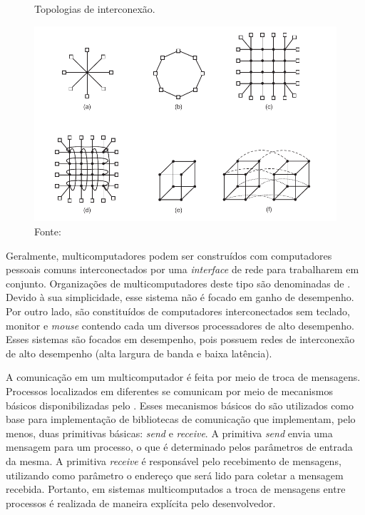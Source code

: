 \begin{figure}[t]
	\centering
        \caption{Topologias de interconexão.}
	\includegraphics[width=\textwidth]{figs/topologia.pdf}
    \caption*{Fonte: \cite{Tanenbaum2015}}
    \label{fig:topologia}
\end{figure}


Geralmente, multicomputadores podem ser construídos com computadores pessoais
comuns interconectados por uma \textit{interface} de rede para trabalharem em
conjunto. Organizações de multicomputadores deste tipo são denominadas de \now. Devido à sua
simplicidade, esse sistema não é focado em ganho de desempenho. Por outro lado, \cow
são constituídos de computadores interconectados sem teclado, monitor e \textit{mouse} contendo cada
um diversos processadores de alto desempenho. Esses sistemas são focados em desempenho, pois
possuem redes de interconexão de alto desempenho (alta largura de banda e baixa latência).

A comunicação em um multicomputador é feita por meio de troca de mensagens.
Processos localizados em diferentes \cpus se comunicam por meio de mecanismos básicos
disponibilizadas pelo \so. Esses mecanismos básicos do \so são utilizados como base para implementação
de bibliotecas de comunicação que implementam, pelo menos, duas primitivas básicas: \textit{send} e \textit{receive}.
A primitiva \textit{send} envia uma mensagem para um processo, o que é determinado pelos
parâmetros de entrada da mesma. A primitiva \textit{receive} é responsável pelo recebimento
de mensagens, utilizando como parâmetro o endereço que será lido para coletar a
mensagem recebida. Portanto, em sistemas multicomputados a troca de mensagens
entre processos é realizada de maneira explícita pelo desenvolvedor.


